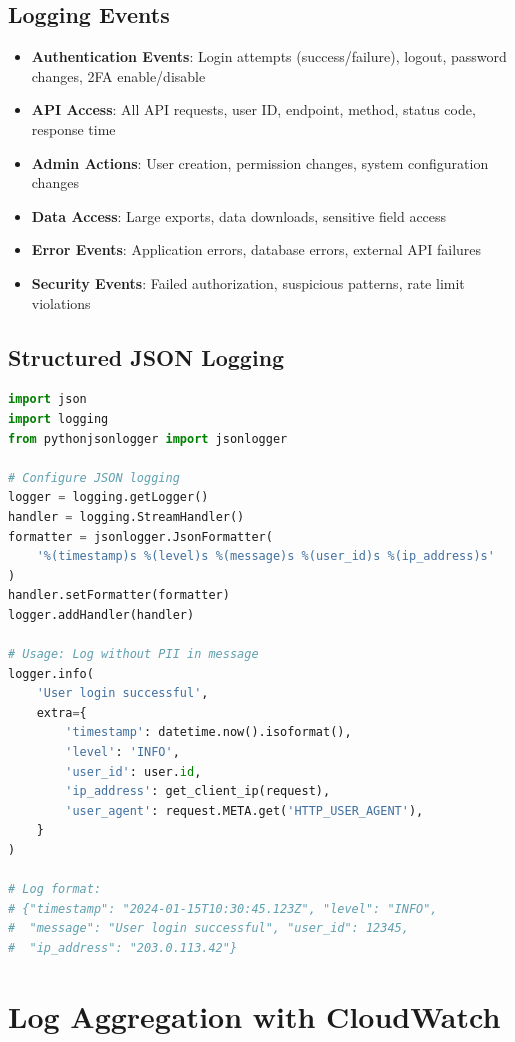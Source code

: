 \documentclass{report}
\begin{document}
\subsection{Logging Events}
\begin{itemize}
\item \textbf{Authentication Events}: Login attempts (success/failure), logout, password changes, 2FA enable/disable
\item \textbf{API Access}: All API requests, user ID, endpoint, method, status code, response time
\item \textbf{Admin Actions}: User creation, permission changes, system configuration changes
\item \textbf{Data Access}: Large exports, data downloads, sensitive field access
\item \textbf{Error Events}: Application errors, database errors, external API failures
\item \textbf{Security Events}: Failed authorization, suspicious patterns, rate limit violations
\end{itemize}

\subsection{Structured JSON Logging}
\begin{lstlisting}[language=Python]
import json
import logging
from pythonjsonlogger import jsonlogger

# Configure JSON logging
logger = logging.getLogger()
handler = logging.StreamHandler()
formatter = jsonlogger.JsonFormatter(
    '%(timestamp)s %(level)s %(message)s %(user_id)s %(ip_address)s'
)
handler.setFormatter(formatter)
logger.addHandler(handler)

# Usage: Log without PII in message
logger.info(
    'User login successful',
    extra={
        'timestamp': datetime.now().isoformat(),
        'level': 'INFO',
        'user_id': user.id,
        'ip_address': get_client_ip(request),
        'user_agent': request.META.get('HTTP_USER_AGENT'),
    }
)

# Log format:
# {"timestamp": "2024-01-15T10:30:45.123Z", "level": "INFO", 
#  "message": "User login successful", "user_id": 12345, 
#  "ip_address": "203.0.113.42"}
\end{lstlisting}

\section{Log Aggregation with CloudWatch}
\end{document}
